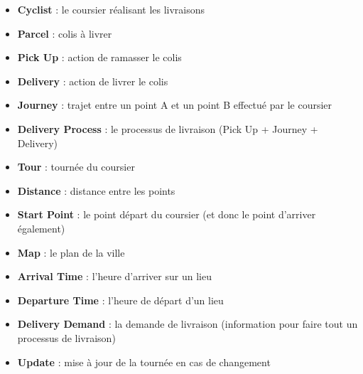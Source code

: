 \documentclass{scrartcl}
\begin{document}
\begin{itemize}
\item \textbf{Cyclist} : le coursier réalisant les livraisons
\item \textbf{Parcel} : colis à livrer
\item \textbf{Pick Up }: action de ramasser le colis 
\item \textbf{Delivery} : action de livrer le colis
\item \textbf{Journey} : trajet entre un point A et un point B effectué par le coursier
\item \textbf{Delivery Process }: le processus de livraison (Pick Up + Journey + Delivery)
\item \textbf{Tour} : tournée du coursier
\item \textbf{Distance} : distance entre les points
\item \textbf{Start Point} : le point départ du coursier (et donc le point d'arriver également)
\item \textbf{Map} : le plan de la ville
\item \textbf{Arrival Time }: l'heure d'arriver sur un lieu
\item \textbf{Departure Time} : l'heure de départ d'un lieu
\item \textbf{Delivery Demand} : la demande de livraison (information pour faire tout un processus de livraison)
\item \textbf{Update }: mise à jour de la tournée en cas de changement

\end{itemize}
\end{document}
